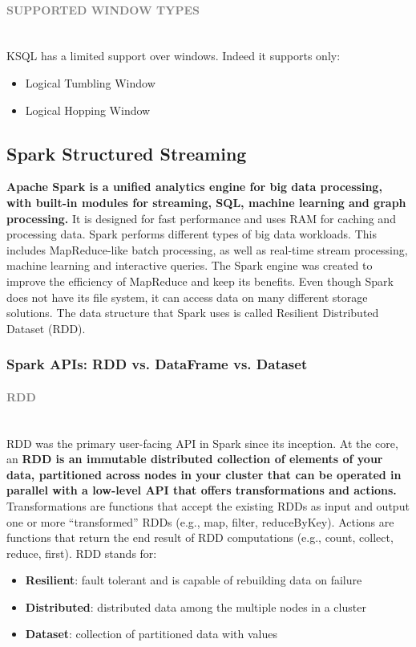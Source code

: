 \documentclass[10pt,a4paper]{article}
\newcommand{\myparagraph}[1]{\paragraph{\normalsize{\textcolor{gray}{\uppercase{\textbf{#1}}}} }\mbox{} \vspace{0.5em}\\}
\begin{document}
\myparagraph{Supported Window Types}
KSQL has a limited support over windows. Indeed it supports only:
\begin{itemize}
	\item Logical Tumbling Window
	\item Logical Hopping Window
\end{itemize}

\subsection{Spark Structured Streaming}
\textbf{Apache Spark is a unified analytics engine for big data processing, with built-in modules for streaming, SQL, machine learning and graph processing.} It is designed for fast performance and uses RAM for caching and processing data. Spark performs different types of big data workloads. This includes MapReduce-like batch processing, as well as real-time stream processing, machine learning and interactive queries. The Spark engine was created to improve the efficiency of MapReduce and keep its benefits. Even though Spark does not have its file system, it can access data on many different storage solutions. The data structure that Spark uses is called Resilient Distributed Dataset (RDD).
\subsubsection{Spark APIs: RDD vs. DataFrame vs. Dataset}
\myparagraph{RDD}
RDD was the primary user-facing API in Spark since its inception. At the core, an \textbf{RDD is an immutable distributed collection of elements of your data, partitioned across nodes in your cluster that can be operated in parallel with a low-level API that offers transformations and actions.} Transformations are functions that accept the existing RDDs as input and output one or more “transformed” RDDs (e.g., map, filter, reduceByKey). Actions are functions that return the end result of RDD computations (e.g., count, collect, reduce, first).
RDD stands for:
\begin{itemize}
	\item \textbf{Resilient}: fault tolerant and is capable of rebuilding data on failure
	\item \textbf{Distributed}: distributed data among the multiple nodes in a cluster
	\item \textbf{Dataset}: collection of partitioned data with values
\end{itemize}
\end{document}
